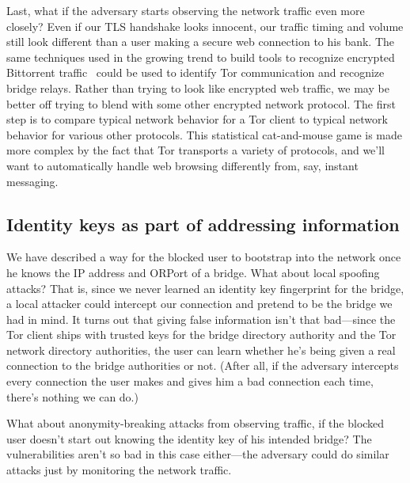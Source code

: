 \documentclass{llncs}
\begin{document}
Last, what if the adversary starts observing the network traffic even
more closely? Even if our TLS handshake looks innocent, our traffic timing
and volume still look different than a user making a secure web connection
to his bank. The same techniques used in the growing trend to build tools
to recognize encrypted Bittorrent traffic~\cite{bt-traffic-shaping}
could be used to identify Tor communication and recognize bridge
relays. Rather than trying to look like encrypted web traffic, we may be
better off trying to blend with some other encrypted network protocol. The
first step is to compare typical network behavior for a Tor client to
typical network behavior for various other protocols. This statistical
cat-and-mouse game is made more complex by the fact that Tor transports a
variety of protocols, and we'll want to automatically handle web browsing
differently from, say, instant messaging.


\subsection{Identity keys as part of addressing information}

We have described a way for the blocked user to bootstrap into the
network once he knows the IP address and ORPort of a bridge. What about
local spoofing attacks? That is, since we never learned an identity
key fingerprint for the bridge, a local attacker could intercept our
connection and pretend to be the bridge we had in mind. It turns out
that giving false information isn't that bad---since the Tor client
ships with trusted keys for the bridge directory authority and the Tor
network directory authorities, the user can learn whether he's being
given a real connection to the bridge authorities or not. (After all,
if the adversary intercepts every connection the user makes and gives
him a bad connection each time, there's nothing we can do.)

What about anonymity-breaking attacks from observing traffic, if the
blocked user doesn't start out knowing the identity key of his intended
bridge? The vulnerabilities aren't so bad in this case either---the
adversary could do similar attacks just by monitoring the network
traffic.
\end{document}
